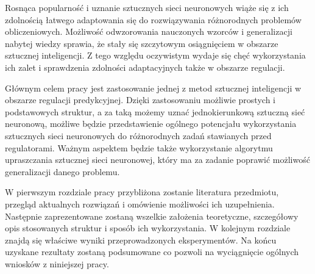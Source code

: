 \par Rosnąca popularność i uznanie sztucznych sieci neuronowych wiąże się z ich zdolnością łatwego adaptowania się do rozwiązywania różnorodnych problemów obliczeniowych. Możliwość odwzorowania nauczonych wzorców i generalizacji nabytej wiedzy sprawia, że stały się szczytowym osiągnięciem w obszarze sztucznej inteligencji. Z tego względu oczywistym wydaje się chęć wykorzystania ich zalet i sprawdzenia zdolności adaptacyjnych także w obszarze regulacji.
  
\par Głównym celem pracy jest zastosowanie jednej z metod sztucznej inteligencji w obszarze regulacji predykcyjnej. Dzięki zastosowaniu możliwie prostych i podstawowych struktur, a za taką możemy uznać jednokierunkową sztuczną sieć neuronową, możliwe będzie przedstawienie ogólnego potencjału wykorzystania sztucznych sieci neuronowych do różnorodnych zadań stawianych przed regulatorami. Ważnym aspektem będzie także wykorzystanie algorytmu upraszczania sztucznej sieci neuronowej, który ma za zadanie poprawić możliwość generalizacji danego problemu. 

\par W pierwszym rozdziale pracy przybliżona zostanie literatura przedmiotu, przegląd aktualnych rozwiązań i omówienie możliwości ich uzupełnienia. Następnie zaprezentowane zostaną wszelkie założenia teoretyczne, szczegółowy opis stosowanych struktur i sposób ich wykorzystania. W kolejnym rozdziale znajdą się właściwe wyniki przeprowadzonych eksperymentów. Na końcu uzyskane rezultaty zostaną podsumowane co pozwoli na wyciągnięcie ogólnych wniosków z niniejszej pracy. 



